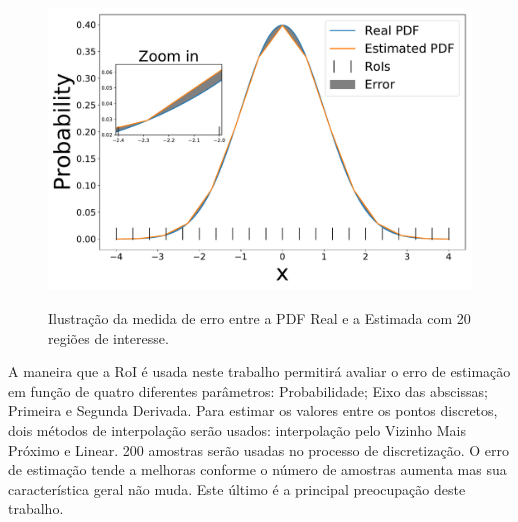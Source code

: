 \begin{figure}[!ht]
	\centering
	\includegraphics[width=0.6\linewidth]{./figuras/error1}\\
	\caption{Ilustração da medida de erro entre a PDF Real e a Estimada com 20 regiões de interesse.}
	\label{fig:error}
\end{figure}


A maneira que a \ac{RoI} é usada neste trabalho permitirá avaliar o erro de estimação em função de quatro diferentes parâmetros: Probabilidade; Eixo das abscissas; Primeira e Segunda Derivada. Para estimar os valores entre os pontos discretos, dois métodos de interpolação serão usados: interpolação pelo Vizinho Mais Próximo e Linear. 200 amostras serão usadas no processo de discretização. O erro de estimação tende a melhoras conforme o número de amostras aumenta mas sua característica geral não muda. Este último é a principal preocupação deste trabalho. 

